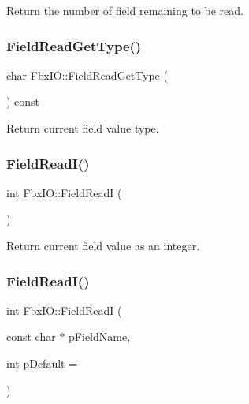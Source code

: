 Return the number of field remaining to be read. 

\mbox{\label{class_fbx_i_o_af4678c1d469f444fe96bead9668f4083}} 
\subsubsection{\texorpdfstring{Field\+Read\+Get\+Type()}{FieldReadGetType()}}
{\footnotesize\ttfamily char Fbx\+I\+O\+::\+Field\+Read\+Get\+Type (\begin{DoxyParamCaption}{ }\end{DoxyParamCaption}) const}



Return current field value type. 

\mbox{\label{class_fbx_i_o_a6fd89404042ffd3eea33c7295f6717c2}} 
\subsubsection{\texorpdfstring{Field\+Read\+I()}{FieldReadI()}\hspace{0.1cm}{\footnotesize\ttfamily [1/2]}}
{\footnotesize\ttfamily int Fbx\+I\+O\+::\+Field\+ReadI (\begin{DoxyParamCaption}{ }\end{DoxyParamCaption})}



Return current field value as an integer. 

\mbox{\label{class_fbx_i_o_a98a0fa638e8b8b767f86a441ae45da52}} 
\subsubsection{\texorpdfstring{Field\+Read\+I()}{FieldReadI()}\hspace{0.1cm}{\footnotesize\ttfamily [2/2]}}
{\footnotesize\ttfamily int Fbx\+I\+O\+::\+Field\+ReadI (\begin{DoxyParamCaption}\item[{const char $\ast$}]{p\+Field\+Name,  }\item[{int}]{p\+Default = {} }\end{DoxyParamCaption})}

